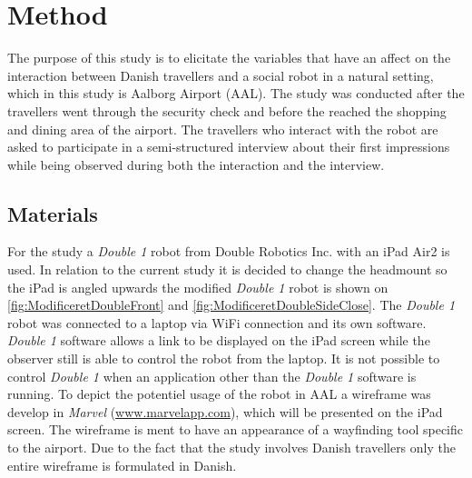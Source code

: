 \section{Method}
\label{Method}
%
The purpose of this study is to elicitate the variables that have an affect on the interaction between Danish travellers and a social robot in a natural setting, which in this study is Aalborg Airport (AAL). The study was conducted after the travellers went through the security check and before the reached the shopping and dining area of the airport. The travellers who interact with the robot are asked to participate in a semi-structured interview about their first impressions while being observed during both the interaction and the interview. 

\subsection{Materials}
For the study a \textit{Double 1} robot from Double Robotics Inc. with an iPad Air2 is used. In relation to the current study it is decided to change the headmount so the iPad is angled upwards the modified \textit{Double 1} robot is shown on \autoref{fig:ModificeretDoubleFront} and \autoref{fig:ModificeretDoubleSideClose}. The \textit{Double 1} robot was connected to a laptop via WiFi connection and its own software. \textit{Double 1} software allows a link to be displayed on the iPad screen while the observer still is able to control the robot from the laptop. It is not possible to control \textit{Double 1} when an application other than the \textit{Double 1} software is running. To depict the potentiel usage of the robot in AAL a wireframe was develop in \textit{Marvel} (\url{www.marvelapp.com}), which will be presented on the iPad screen. The wireframe is ment to have an appearance of a wayfinding tool specific to the airport. Due to the fact that the study involves Danish travellers only the entire wireframe is formulated in Danish. 
%
